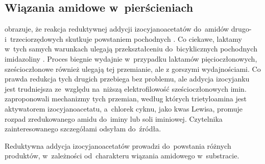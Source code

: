 \subsection{Wiązania amidowe w~pierścieniach}\label{literature:schwartz:rings}
 obrazuje, że reakcja reduktywnej addycji izocyjanoacetatów
   do~amidów drugo-  i~trzeciorzędowych
   skutkuje powstaniem pochodnych 
  .
Co ciekawe,  laktamy  w~tych samych warunkach ulegają
  przekształceniu do~bicyklicznych pochodnych imidazoliny .
Proces biegnie wydajnie w~przypadku laktamów pięcioczłonowych, sześcioczłonowe również ulegają
  tej przemianie, ale z gorszymi wydajnościami.
Co prawda redukcja tych drugich przebiega bez problemu, ale addycja izocyjanku jest trudniejsza
  ze~względu na~niższą elektrofilowość sześcioczłonowych imin.
\citeauthor{zheng17} zaproponowali mechanizmy tych przemian, według których trietyloamina
  jest aktywatorem izocyjanoacetatu, a~chlorek cyknu, jako kwas Lewisa, promuje rozpad
  zredukowanego amidu do~iminy lub soli iminiowej.
Czytelnika zainteresowanego szczegółami odsyłam do~źródła.
\begin{marginscheme}[-5\baselineskip]
  
  \caption{
    Reduktywna addycja izocyjanoacetatów prowadzi do~powstania różnych produktów,
      w~zależności od~charakteru wiązania amidowego w~substracie.
  }
  \label{sch:zr-ncac-add}
\end{marginscheme}

